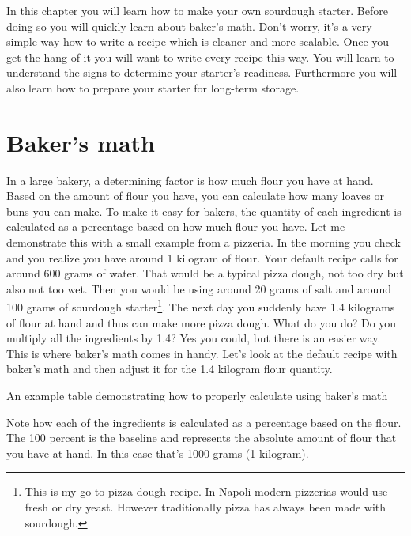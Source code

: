 In this chapter you will learn how to make your
own sourdough starter. Before doing so you will
quickly learn about baker's math. Don't worry,
it's a very simple way how to write a recipe which
is cleaner and more scalable. Once you get the hang
of it you will want to write every recipe this way.
You will learn to understand the signs to determine
your starter's readiness. Furthermore you will
also learn how to prepare your starter for long-term storage.

\section{Baker's math}%
\label{section:bakers-math}

In a large bakery, a determining factor is how
much flour you have at hand. Based on the amount
of flour you have, you can calculate how many
loaves or buns you can make. To make it easy
for bakers, the quantity of each ingredient
is calculated as a percentage based on how much flour you have.
Let me demonstrate this with a small example from
a pizzeria. In the morning you check and you realize you
have around 1 kilogram of flour.
Your default recipe calls for around 600 grams of water.
That would be a typical pizza dough, not too dry but
also not too wet. Then you would be using around 20 grams
of salt and around 100 grams of sourdough starter\footnote{This is my go to
pizza dough recipe. In Napoli modern pizzerias would use fresh or dry yeast.
However traditionally pizza has always been made with sourdough.}.
The next day you suddenly have 1.4 kilograms of flour
at hand and thus can make more pizza dough. What do you do?
Do you multiply all the ingredients by 1.4? Yes you could,
but there is an easier way. This is where baker's math
comes in handy. Let's look at the default recipe with baker's
math and then adjust it for the 1.4 kilogram flour quantity.

\begin{table}[!htb]
\begin{center}
  
  \caption{An example table demonstrating how to properly calculate using baker's math}
\end{center}
\end{table}

Note how each of the ingredients is calculated as a percentage
based on the flour. The 100 percent is the baseline and represents the absolute
amount of flour that you have at hand. In this case that's 1000 grams
(1 kilogram).


